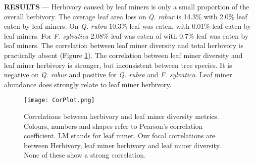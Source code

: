 \documentclass[b5paper,10pt]{book} %
\newenvironment{newchapterbox}{%
\def\chaptername{BOX}\def\appendixname{BOX}\appendices}%
{\endappendices}
\renewcommand{\appendixname}{}
\begin{document}
\begin{newchapterbox}
	\textbf{RESULTS} --- Herbivory caused by leaf miners is only a small proportion of the overall herbivory. The average leaf area loss on \textit{Q. robur} is 14.3\% with 2.0\% leaf eaten by leaf miners. On \textit{Q. rubra} 10.3\% leaf was eaten, with 0.01\% leaf eaten by leaf miners. For \textit{F. sylvatica} 2.08\% leaf was eaten of with 0.7\% leaf was eaten by leaf miners. The correlation between leaf miner diversity and total herbivory is practically absent (Figure \ref{BOXfig}). The correlation between leaf miner diversity and leaf miner herbivory is stronger, but inconsistent between tree species. It is negative on \textit{Q. robur} and positive for \textit{Q. rubra} and \textit{F. sylvatica}. Leaf miner abundance does strongly relate to leaf miner herbivory.

	\begin{figure}[t!]
		\begin{center}
			\texttt{[image: CorPlot.png]}
		\end{center}
			\caption{Correlations between herbivory and leaf miner diversity metrics. Colours, numbers and shapes refer to Pearson’s correlation coefficient. LM stands for leaf miner. Our focal correlations are between Herbivory, leaf miner herbivory and leaf miner diversity. None of these show a strong correlation. \label{BOXfig}}
	\end{figure}


\end{newchapterbox}
\end{document}
